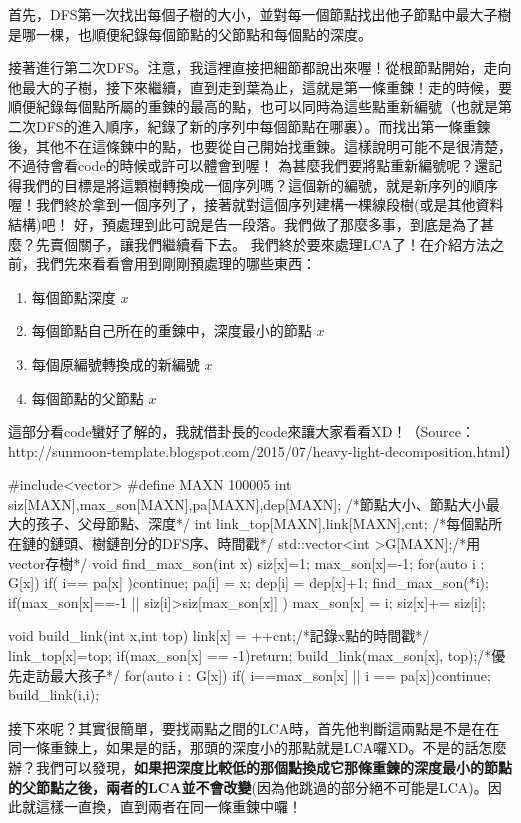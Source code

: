 	首先，DFS第一次找出每個子樹的大小，並對每一個節點找出他子節點中最大子樹是哪一棵，也順便紀錄每個節點的父節點和每個點的深度。
	
	接著進行第二次DFS。注意，我這裡直接把細節都說出來喔！從根節點開始，走向他最大的子樹，接下來繼續，直到走到葉為止，這就是第一條重鍊！走的時候，要順便紀錄每個點所屬的重鍊的最高的點，也可以同時為這些點重新編號（也就是第二次DFS的進入順序，紀錄了新的序列中每個節點在哪裏）。而找出第一條重鍊後，其他不在這條鍊中的點，也要從自己開始找重鍊。這樣說明可能不是很清楚，不過待會看code的時候或許可以體會到喔！
	為甚麼我們要將點重新編號呢？還記得我們的目標是將這顆樹轉換成一個序列嗎？這個新的編號，就是新序列的順序喔！我們終於拿到一個序列了，接著就對這個序列建構一棵線段樹(或是其他資料結構)吧！
	好，預處理到此可說是告一段落。我們做了那麼多事，到底是為了甚麼？先賣個關子，讓我們繼續看下去。
	我們終於要來處理LCA了！在介紹方法之前，我們先來看看會用到剛剛預處理的哪些東西：
	\begin{enumerate}
		\item 每個節點深度 \inline{dep[}$x$\inline{]}
		\item 每個節點自己所在的重鍊中，深度最小的節點 \inline{link\_top[}$x$\inline{]}
		\item 每個原編號轉換成的新編號 \inline{link[}$x$\inline{]}
		\item 每個節點的父節點 \inline{pa[}$x$\inline{]}
	\end{enumerate}
這部分看code蠻好了解的，我就借卦長的code來讓大家看看XD！（Source： http://sunmoon-template.blogspot.com/2015/07/heavy-light-decomposition.html）
	\begin{C++}
#include<vector>
#define MAXN 100005
int siz[MAXN],max_son[MAXN],pa[MAXN],dep[MAXN];
/*節點大小、節點大小最大的孩子、父母節點、深度*/
int link_top[MAXN],link[MAXN],cnt;
/*每個點所在鏈的鏈頭、樹鏈剖分的DFS序、時間戳*/
std::vector<int >G[MAXN];/*用vector存樹*/
void find_max_son(int x){
	siz[x]=1;
	max_son[x]=-1;
	for(auto i : G[x]){
		if( i== pa[x] )continue;
		pa[i] = x;
		dep[i] = dep[x]+1;
		find_max_son(*i);
		if(max_son[x]==-1 || siz[i]>siz[max_son[x]] ) max_son[x] = i;
		siz[x]+= siz[i];
	}
}

void build_link(int x,int top){
	link[x] = ++cnt;/*記錄x點的時間戳*/
	link_top[x]=top;
	if(max_son[x] == -1)return;
	build_link(max_son[x], top);/*優先走訪最大孩子*/
	for(auto i : G[x]){
		if( i==max_son[x] || i == pa[x])continue;
		build_link(i,i);
	}
}
	\end{C++}
	接下來呢？其實很簡單，要找兩點之間的LCA時，首先他判斷這兩點是不是在在同一條重鍊上，如果是的話，那頭的深度小的那點就是LCA囉XD。不是的話怎麼辦？我們可以發現，\textbf{如果把深度比較低的那個點換成它那條重鍊的深度最小的節點的父節點之後，兩者的LCA並不會改變}(因為他跳過的部分絕不可能是LCA)。因此就這樣一直換，直到兩者在同一條重鍊中囉！
